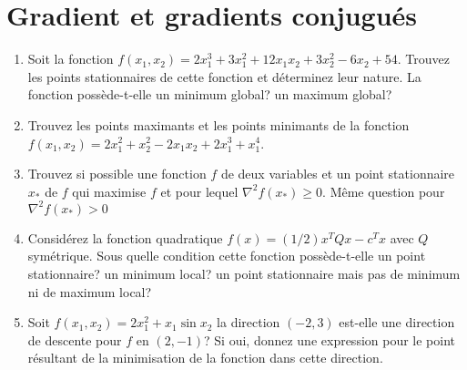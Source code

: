 \section{Gradient et gradients conjugués}

\begin{enumerate}

  \item Soit la fonction $f(x_1, x_2)= 2 x_1^3+3 x_1^2+12x_1 x_2 + 3 x_2^2
    -6 x_2 + 54$. Trouvez les points stationnaires de cette fonction et déterminez leur nature.
    La fonction possède-t-elle un minimum global? un maximum global?

    \begin{solution}
    \end{solution}

  \item Trouvez les points maximants et les points minimants de la fonction $f(x_1, x_2)=2x_1^2+x_2^2-2x_1x_2+2x_1^3+x_1^4$.

    \begin{solution}
    \end{solution}

  \item Trouvez si possible une fonction $f$ de deux variables et un point stationnaire $x_*$ de $f$ qui maximise $f$ et pour lequel
    $\nabla^2 f(x_*)
    \geq 0$. Même question pour  $\nabla^2 f(x_*)> 0$

    \begin{solution}
    \end{solution}

  \item Considérez la fonction quadratique $f(x)=(1/2) x^T Q x-c^T x$ avec $Q$ symétrique. Sous quelle condition cette fonction possède-t-elle un
    point stationnaire? un minimum local? un point stationnaire mais pas de minimum ni de maximum local?

    \begin{solution}
    \end{solution}

  \item Soit $f(x_1, x_2)=2x_1^2+x_1 \sin x_2$ la direction $(-2, 3)$ est-elle une direction de descente pour $f$ en $(2, -1)$? Si oui, donnez
    une expression pour le point résultant de la minimisation de la fonction dans cette direction.


    \begin{solution}
    \end{solution}


\end{enumerate}
